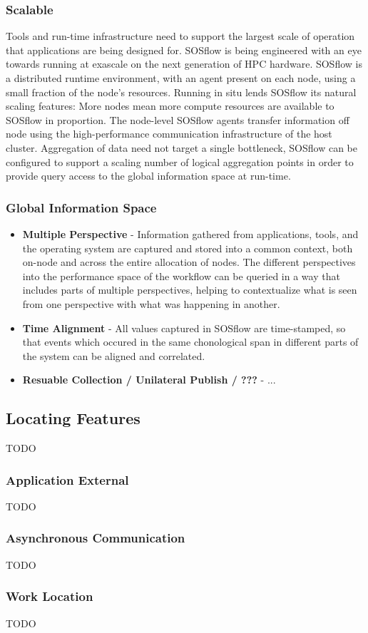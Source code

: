 \subsubsection{Scalable}
%
Tools and run-time infrastructure need to support the largest scale of
operation that applications are being designed for.
%
SOSflow is being engineered with an eye towards running at exascale
on the next generation of HPC hardware.
%
SOSflow is a distributed runtime environment, with an agent present
on each node, using a small fraction of the node's resources.
%
Running in situ lends SOSflow its natural scaling features: More nodes
mean more compute resources are available to SOSflow in proportion.
%
The node-level SOSflow agents transfer information off node using
the high-performance communication infrastructure of the host cluster.
%
Aggregation of data need not target a single bottleneck, SOSflow can
be configured to support a scaling number of logical aggregation points
in order to provide query access to the global information space at
run-time.
%
\subsubsection{Global Information Space}
     \begin{itemize}
        \item \textbf{Multiple Perspective} - Information gathered from
          applications, tools, and the operating system are captured
          and stored into a common context, both on-node and across
          the entire allocation of nodes.  The different perspectives
          into the performance space of the workflow can be queried
          in a way that includes parts of multiple perspectives,
          helping to contextualize what is seen from one perspective
          with what was happening in another.
        \item \textbf{Time Alignment} - All values captured in SOSflow
          are time-stamped, so that events which occured in the same
          chonological span in different parts of the system can be
          aligned and correlated.
        \item \textbf{Resuable Collection / Unilateral Publish / ???} - ...
     \end{itemize}


\subsection{Locating Features} %
TODO
\subsubsection{Application External} %
TODO
\subsubsection{Asynchronous Communication} %
TODO
\subsubsection{Work Location} %
TODO


